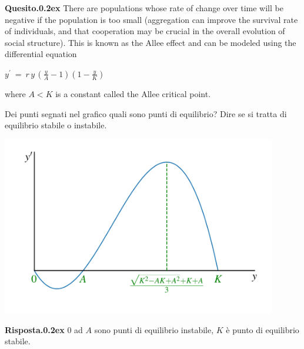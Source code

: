 \documentclass[12pt,twoside,a4paper]{article}
\newenvironment{question}{\par\bigskip\textbf{Quesito.\kern0.2ex}}{\vspace{\parskip}}
\newenvironment{answer}{\par\bigskip\textbf{Risposta.\kern0.2ex}}{}
\begin{document}
\begin{question}
There are populations whose rate of change over time will be negative if the population is too small (aggregation can improve the survival rate of individuals, and that cooperation may be crucial in the overall evolution of social structure). This is known as the Allee effect and can be modeled using the differential equation

\hfil$\displaystyle y^\prime\ =\ r\, y\, \left( \frac{y}{A} - 1 \right) \left( 1 - \frac{y}{K} \right)$

where $A<K$ is a constant called the Allee critical point.

Dei punti segnati nel grafico quali sono punti di equilibrio?
Dire se si tratta di equilibrio stabile o instabile.

\hfil\includegraphics[width=0.9\textwidth]{Allee.pdf}

\begin{answer}
$0$ ad $A$ sono punti di equilibrio instabile, $K$ è punto di equilibrio stabile.


\end{answer}
\end{question}
\end{document}
